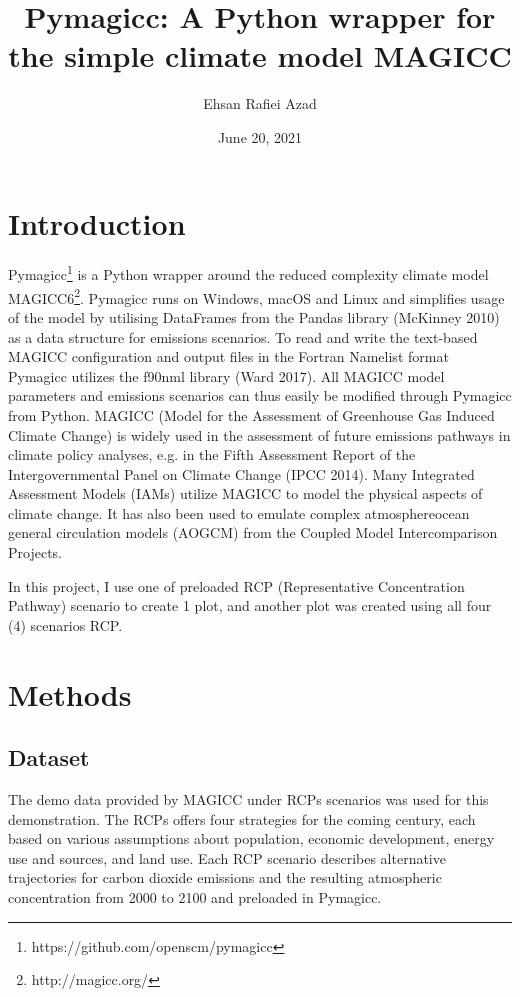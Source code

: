 \documentclass[12pt, letterpaper]{article}
\title{Pymagicc: A Python wrapper for the simple climate model MAGICC}
\author{Ehsan Rafiei Azad}
\date{June 20, 2021}
\begin{document}
\maketitle

\section{Introduction}
Pymagicc\footnote{https://github.com/openscm/pymagicc} is a Python wrapper around the reduced complexity climate model MAGICC6\footnote{http://magicc.org/}.  
Pymagicc runs on Windows, macOS and Linux and simplifies usage of the model by
utilising DataFrames from the Pandas library (McKinney 2010) as a data structure for
emissions scenarios. To read and write the text-based MAGICC configuration and output
files in the Fortran Namelist format Pymagicc utilizes the f90nml library (Ward 2017). All MAGICC model parameters and emissions scenarios can thus easily be modified through
Pymagicc from Python. MAGICC (Model for the Assessment of Greenhouse Gas Induced Climate Change) is widely used in the assessment of future emissions pathways in climate policy analyses, e.g. in the Fifth Assessment Report of the Intergovernmental Panel on Climate Change (IPCC 2014). Many Integrated Assessment Models (IAMs) utilize MAGICC to model the
physical aspects of climate change. It has also been used to emulate complex atmosphereocean general circulation models (AOGCM) from the Coupled Model Intercomparison
Projects.

In this project, I use one of preloaded RCP (Representative Concentration Pathway) scenario to create 1 plot, and another plot was created using all four (4) scenarios RCP. 
 


\section{Methods}

\subsection{Dataset}
The demo data provided by MAGICC under RCPs scenarios was used for this demonstration. The RCPs offers four strategies for the coming century, each based on various assumptions about population, economic development, energy use and sources, and land use.
Each RCP scenario describes alternative trajectories for carbon dioxide emissions and the resulting atmospheric concentration from 2000 to 2100 and preloaded in Pymagicc.
\end{document}
